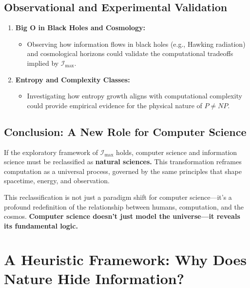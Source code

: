 \documentclass[12pt]{article}
\begin{document}
\subsection{Observational and Experimental Validation}

\begin{enumerate}
    \item \textbf{Big O in Black Holes and Cosmology:}
    \begin{itemize}
        \item Observing how information flows in black holes (e.g., Hawking radiation) and cosmological horizons could validate the computational tradeoffs implied by $\mathcal{I}_{\text{max}}$.
    \end{itemize}

    \item \textbf{Entropy and Complexity Classes:}
    \begin{itemize}
        \item Investigating how entropy growth aligns with computational complexity could provide empirical evidence for the physical nature of $P \neq NP$.
    \end{itemize}
\end{enumerate}

\subsection{Conclusion: A New Role for Computer Science}

If the exploratory framework of $\mathcal{I}_{\text{max}}$ holds, computer science and information science must be reclassified as \textbf{natural sciences.} This transformation reframes computation as a universal process, governed by the same principles that shape spacetime, energy, and observation.

This reclassification is not just a paradigm shift for computer science—it’s a profound redefinition of the relationship between humans, computation, and the cosmos. \textbf{Computer science doesn’t just model the universe—it reveals its fundamental logic.}


\section{A Heuristic Framework: Why Does Nature Hide Information?}
\end{document}

